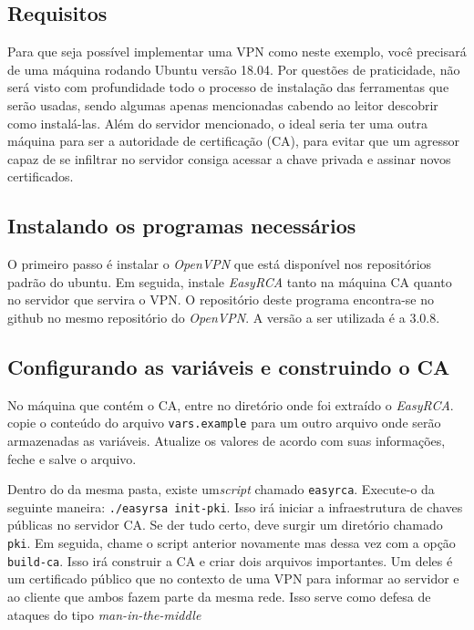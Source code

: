 \documentclass[12pt]{article}
\begin{document}
\begin{flushleft}
\subsection{Requisitos}

Para que seja possível implementar uma VPN como neste exemplo, você precisará
de uma máquina rodando Ubuntu versão 18.04. Por questões de praticidade, não será
visto com profundidade todo o processo de instalação das ferramentas que serão usadas, sendo algumas 
apenas mencionadas cabendo ao leitor descobrir como instalá-las. Além do servidor mencionado,
o ideal seria ter uma outra máquina para ser a autoridade de certificação (CA), para evitar
que um agressor capaz de se infiltrar no servidor consiga acessar a chave privada
e assinar novos certificados. 

\subsection{Instalando os programas necessários}

O primeiro passo é instalar o \emph{OpenVPN} que está disponível nos repositórios padrão do ubuntu.
Em seguida, instale \emph{EasyRCA} tanto na máquina CA quanto no servidor que servira o VPN.
O repositório deste programa encontra-se no github no mesmo repositório do \emph{OpenVPN}. 
A versão a ser utilizada é a 3.0.8.

\subsection{Configurando as variáveis e construindo o CA}

No máquina que contém o CA, entre no diretório onde foi extraído o \emph{EasyRCA}. copie o conteúdo
do arquivo \texttt{vars.example} para um outro arquivo onde serão armazenadas as variáveis. Atualize
os valores de acordo com suas informações, feche e salve o arquivo. 

Dentro do da mesma pasta, existe um\emph{script} chamado \texttt{easyrca}. Execute-o da seguinte
maneira: \texttt{./easyrsa init-pki}. Isso irá iniciar a infraestrutura de chaves públicas no servidor CA.
Se der tudo certo, deve surgir um diretório chamado \texttt{pki}. Em seguida, chame o script anterior 
novamente mas dessa vez com a opção \texttt{build-ca}. Isso irá construir a CA e criar
dois arquivos importantes. Um deles é um certificado público que no contexto de uma VPN para informar
ao servidor e ao cliente que ambos fazem parte da mesma rede. Isso serve como defesa de ataques 
do tipo \emph{man-in-the-middle} 




\end{flushleft}
\end{document}
